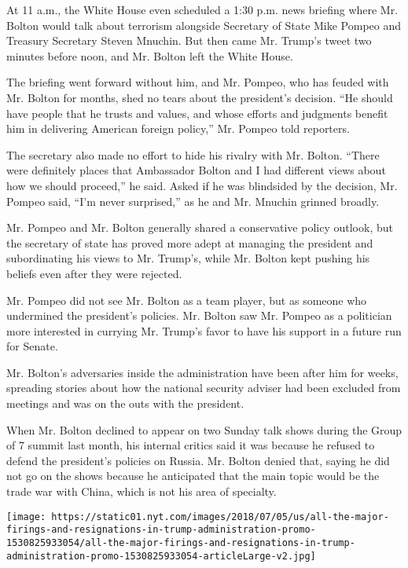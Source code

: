 At 11 a.m., the White House even scheduled a 1:30 p.m. news briefing
where Mr. Bolton would talk about terrorism alongside Secretary of State
Mike Pompeo and Treasury Secretary Steven Mnuchin. But then came Mr.
Trump's tweet two minutes before noon, and Mr. Bolton left the White
House.

The briefing went forward without him, and Mr. Pompeo, who has feuded
with Mr. Bolton for months, shed no tears about the president's
decision. ``He should have people that he trusts and values, and whose
efforts and judgments benefit him in delivering American foreign
policy,'' Mr. Pompeo told reporters.

The secretary also made no effort to hide his rivalry with Mr. Bolton.
``There were definitely places that Ambassador Bolton and I had
different views about how we should proceed,'' he said. Asked if he was
blindsided by the decision, Mr. Pompeo said, ``I'm never surprised,'' as
he and Mr. Mnuchin grinned broadly.

Mr. Pompeo and Mr. Bolton generally shared a conservative policy
outlook, but the secretary of state has proved more adept at managing
the president and subordinating his views to Mr. Trump's, while Mr.
Bolton kept pushing his beliefs even after they were rejected.

Mr. Pompeo did not see Mr. Bolton as a team player, but as someone who
undermined the president's policies. Mr. Bolton saw Mr. Pompeo as a
politician more interested in currying Mr. Trump's favor to have his
support in a future run for Senate.

Mr. Bolton's adversaries inside the administration have been after him
for weeks, spreading stories about how the national security adviser had
been excluded from meetings and was on the outs with the president.

When Mr. Bolton declined to appear on two Sunday talk shows during the
Group of 7 summit last month, his internal critics said it was because
he refused to defend the president's policies on Russia. Mr. Bolton
denied that, saying he did not go on the shows because he anticipated
that the main topic would be the trade war with China, which is not his
area of specialty.

\href{https://www.nytimes.com/interactive/2018/03/16/us/politics/all-the-major-firings-and-resignations-in-trump-administration.html}{}

\texttt{[image: https://static01.nyt.com/images/2018/07/05/us/all-the-major-firings-and-resignations-in-trump-administration-promo-1530825933054/all-the-major-firings-and-resignations-in-trump-administration-promo-1530825933054-articleLarge-v2.jpg]}

